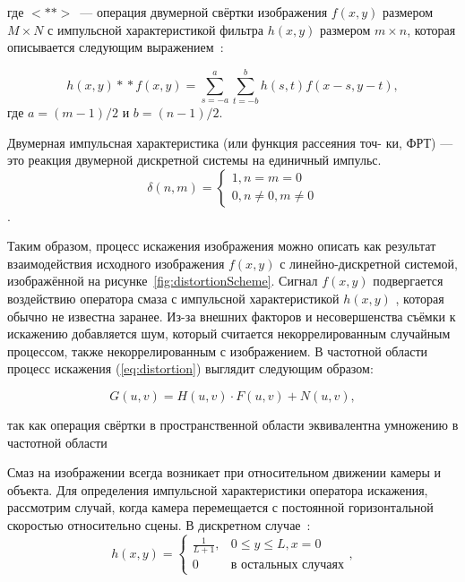 где $<*\!*>$~--- операция двумерной свёртки изображения $f(x,y)$ размером $M\times N$ с импульсной характеристикой фильтра $h(x,y)$ размером $m\times n$, которая описывается следующим выражением~\cite[стр.~298]{gonsalesDigital2012}:

\begin{equation}
h(x,y) *\!* f(x,y) = \sum_{s=-a}^{a}\sum_{t=-b}^{b}h(s,t)f(x-s, y-t),
\end{equation}
где $a=(m-1)/2$ и $b = (n-1)/2$.

\begin{definition}
Двумерная импульсная характеристика (или функция рассеяния точ-
ки, ФРТ) — это реакция двумерной дискретной системы на единичный импульс.
$$\delta(n,m) = 
	\begin{cases}
		1, n=m=0\\
		0, n\ne 0, m\ne 0
	\end{cases}$$.
\end{definition}

Таким образом, процесс искажения изображения можно описать как результат взаимодействия исходного изображения $f(x, y)$ с линейно-дискретной системой, изображённой на рисунке~\ref{fig:distortionScheme}. Сигнал $f(x, y)$ подвергается воздействию оператора смаза с импульсной характеристикой $h(x, y)$ , которая обычно не известна заранее. Из-за внешних факторов и несовершенства съёмки к искажению добавляется шум, который считается некоррелированным случайным процессом, также некоррелированным с изображением.
В частотной области процесс искажения (\ref{eq:distortion}) выглядит следующим образом:

\begin{equation}\label{eq:distortionFourier}
G(u,v) = H(u,v)\cdot F(u,v) + N(u,v),
\end{equation}

так как операция свёртки в пространственной области эквивалентна умножению в частотной области\cite[стр.~39]{basicsOfDigitalDataProcessing2016Umnyashkin}

Смаз на изображении всегда возникает при относительном движении камеры и объекта. Для определения импульсной характеристики оператора искажения, рассмотрим случай, когда камера перемещается с постоянной горизонтальной скоростью относительно сцены. В дискретном случае~\cite{iterableImageRestorationBiemonLangdeik}:
\begin{equation}\label{eq:horizontalBlurPsf}
	h(x,y) = 
		\begin{cases}
			\frac{1}{L+1}, & 0 \leq y \leq L, x=0\\
			0              & \text{в остальных случаях}
		\end{cases},
\end{equation}

